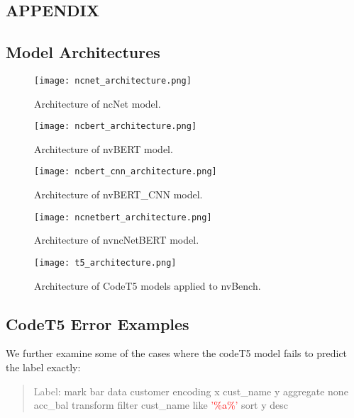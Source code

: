 \documentclass[
	a4paper, %
	10pt, %
	unnumberedsections, %
	twoside, %
]{t0003}
\newcommand{\gray}[1]{\textcolor{gray}{#1}}
\newcommand{\red}[1]{\textcolor{red}{#1}}
\begin{document}
\clearpage
\begin{appendices}

\section*{APPENDIX}

\subsection{Model Architectures}

\begin{figure}[H]
	\texttt{[image: ncnet\_architecture.png]}
	\caption{Architecture of ncNet model.}
	\label{fig:ncnet}
\end{figure}

\begin{figure}[H]
	\texttt{[image: ncbert\_architecture.png]}
	\caption{Architecture of nvBERT model.}
	\label{fig:ncbert}
\end{figure}

\begin{figure}[H]
	\texttt{[image: ncbert\_cnn\_architecture.png]}
	\caption{Architecture of nvBERT\_CNN model.}
	\label{fig:ncbertcnn}
\end{figure}

\begin{figure}[H]
	\texttt{[image: ncnetbert\_architecture.png]}
	\caption{Architecture of nvncNetBERT model.}
	\label{fig:ncnetbert}
\end{figure}

\begin{figure}[H]
	\texttt{[image: t5\_architecture.png]}
	\caption{Architecture of CodeT5 models applied to nvBench.}
	\label{fig:codetf}
\end{figure}

\subsection{CodeT5 Error Examples}

We further examine some of the cases where the codeT5 model fails to predict the label exactly:

\begin{quote}
\gray{Label}: mark bar data customer encoding x cust\_name y aggregate none acc\_bal transform filter cust\_name like \red{'\%a\%'} sort y desc
\end{quote}


\end{appendices}
\end{document}
